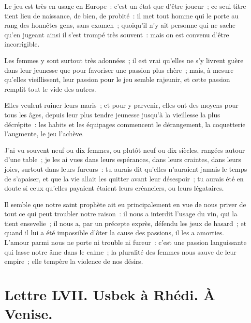 \documentclass[french,twoside]{book} %
\newcommand{\dateline}[1]{\medskip{\RaggedLeft{#1}\par}\bigskip}
\begin{document}
\noindent Le jeu est très en usage en Europe : c’est un état que d’être joueur ; ce seul titre tient lieu de naissance, de bien, de probité : il met tout homme qui le porte au rang des honnêtes gens, sans examen ; quoiqu’il n’y ait personne qui ne sache qu’en jugeant ainsi il s’est trompé très souvent : mais on est convenu d’être incorrigible.\par
Les femmes y sont surtout très adonnées ; il est vrai qu’elles ne s’y livrent guère dans leur jeunesse que pour favoriser une passion plus chère ; mais, à mesure qu’elles vieillissent, leur passion pour le jeu semble rajeunir, et cette passion remplit tout le vide des autres.\par
Elles veulent ruiner leurs maris ; et pour y parvenir, elles ont des moyens pour tous les âges, depuis leur plus tendre jeunesse jusqu’à la vieillesse la plus décrépite : les habits et les équipages commencent le dérangement, la coquetterie l’augmente, le jeu l’achève.\par
J’ai vu souvent neuf ou dix femmes, ou plutôt neuf ou dix siècles, rangées autour d’une table ; je les ai vues dans leurs espérances, dans leurs craintes, dans leurs joies, surtout dans leurs fureurs : tu aurais dit qu’elles n’auraient jamais le temps de s’apaiser, et que la vie allait les quitter avant leur désespoir ; tu aurais été en doute si ceux qu’elles payaient étaient leurs créanciers, ou leurs légataires.\par
Il semble que notre saint prophète ait eu principalement en vue de nous priver de tout ce qui peut troubler notre raison : il nous a interdit l’usage du vin, qui la tient ensevelie ; il nous a, par un précepte exprès, défendu les jeux de hasard ; et quand il lui a été impossible d’ôter la cause des passions, il les a amorties. L’amour parmi nous ne porte ni trouble ni fureur : c’est une passion languissante qui lasse notre âme dans le calme ; la pluralité des femmes nous sauve de leur empire ; elle tempère la violence de nos désirs.\par

\dateline{À Paris, le 10 de la lune de Zilhagé, 1714.}
\section[{Lettre LVII. Usbek à Rhédi. À Venise.}]{Lettre LVII. Usbek à Rhédi. À Venise.}\renewcommand{\leftmark}{Lettre LVII. Usbek à Rhédi. À Venise.}
\end{document}
